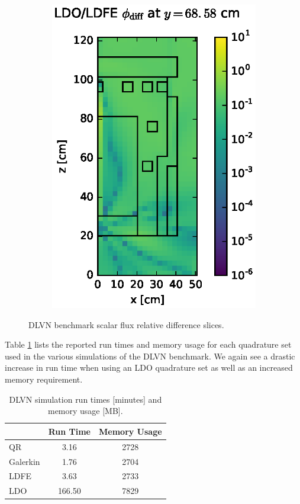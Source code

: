 \documentclass{article} %
\begin{document}
\begin{figure}[!hbt]
\begin{subfigure}{0.4\textwidth}
\includegraphics[max height=0.445\textheight]
{dlvn-flux-diff-ldfe.eps}
\end{subfigure}
\caption{DLVN benchmark scalar flux relative difference slices.}
\label{dlvn-fwd-diff-rel}
\end{figure}

Table \ref{dlvn-stats} lists the reported run times
and memory usage for each quadrature set used in the various simulations of
the DLVN benchmark. We again see a drastic increase in run time when using an
LDO quadrature set as well as an increased memory requirement.

\begin{table}[!htb]
\centering
\caption{DLVN simulation run times [minutes] and memory usage [MB].}
\label{dlvn-stats}
\begin{tabular}{l|cc}
              & Run Time       & Memory Usage       \\ \hline
QR            & 3.16 & 2728         \\
Galerkin      & 1.76 & 2704         \\
LDFE          & 3.63 & 2733         \\
LDO           & 166.50 & 7829
\end{tabular}
\end{table}
\end{document}
